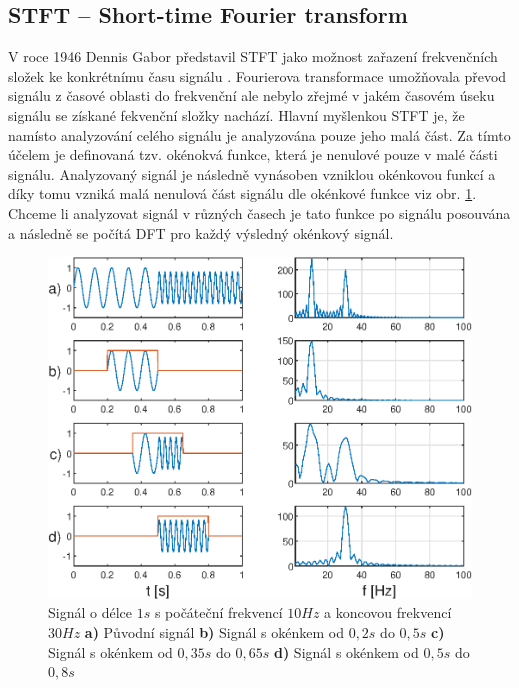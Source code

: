   
  \subsection{STFT -- Short-time Fourier transform} \label{sec:STFT}

  V roce 1946 Dennis Gabor představil \acs{STFT} jako možnost zařazení frekvenčních složek ke konkrétnímu času signálu \cite{strichartz2003guide}.
  Fourierova transformace umožňovala převod signálu z časové oblasti do frekvenční ale nebylo zřejmé v jakém časovém úseku signálu se získané fekvenční složky nachází.
  Hlavní myšlenkou \acs{STFT} je, že namísto analyzování celého signálu je analyzována pouze jeho malá část.
  Za tímto účelem je definovaná tzv. okénokvá funkce, která je nenulové pouze v malé části signálu.
  Analyzovaný signál je následně vynásoben vzniklou okénkovou funkcí a díky tomu vzniká malá nenulová část signálu dle okénkové funkce viz obr. \ref{fig:STFT}.
  Chceme li analyzovat signál v různých časech je tato funkce po signálu posouvána a následně se počítá \acs{DFT} pro každý výsledný okénkový signál.

  \begin{figure}[H]
    \centering
    \includegraphics[width = 1\linewidth]{obrazky/STFT.eps}
    \caption{Signál o délce $1 s$ s počáteční frekvencí $10 Hz$ a koncovou frekvencí $30 Hz$ \textbf{a)} Původní signál \textbf{b)} Signál s okénkem od $0,2 s$ do $0,5 s$ \textbf{c)} Signál s okénkem od $0,35 s$ do $0,65 s$ \textbf{d)} Signál s okénkem od $0,5 s$ do $0,8 s$ \cite{fundamental_of_music_processing}}
    \label{fig:STFT}
  \end{figure}

